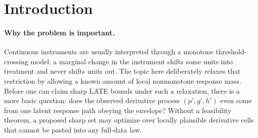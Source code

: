 \documentclass[11pt]{article}
\theoremstyle{definition}
\theoremstyle{plain}
\theoremstyle{remark}
\begin{document}
\begin{abstract}
This proposal pivots from directly bounding the continuous-IV LATE to the prerequisite feasibility problem: which observable derivative processes can be generated by a scalar continuous instrument when local violations of monotonicity are bounded by a known envelope.  Discrete-IV work such as Kitagawa's monotonicity test produces finite conditional-distribution inequalities, while generalized-IV work such as Chesher--Rosen gives broad sharp-set machinery; a scalar continuous instrument with a fixed downward-response envelope creates a sharper function-space compatibility problem because one latent response path must generate all infinitesimal margins.  The flagship conjecture is that feasibility is equivalent to membership in the constructive projection \(K_b^{\mathrm{proj}}\) with a bounded-Lipschitz support-function separation certificate, and that this projection is strictly smaller than an internal locally pasted derivative-envelope relaxation on an open class of observables.  A zero-envelope theorem should recover the Heckman--Vytlacil monotone threshold-crossing derivative restrictions as the corner case.  If resolved, the result would give applied continuous-IV researchers a falsification and calibration diagnostic before reporting any bounded-violation LATE interval.
\end{abstract}

\section{Introduction}
\paragraph{Why the problem is important.}
Continuous instruments are usually interpreted through a monotone threshold-crossing model: a marginal change in the instrument shifts some units into treatment and never shifts units out.  The topic here deliberately relaxes that restriction by allowing a known amount of local nonmonotone response mass.  Before one can claim sharp LATE bounds under such a relaxation, there is a more basic question: does the observed derivative process \((p',g',h')\) even come from one latent response path obeying the envelope?  Without a feasibility theorem, a proposed sharp set may optimize over locally plausible derivative cells that cannot be pasted into any full-data law.
\end{document}
